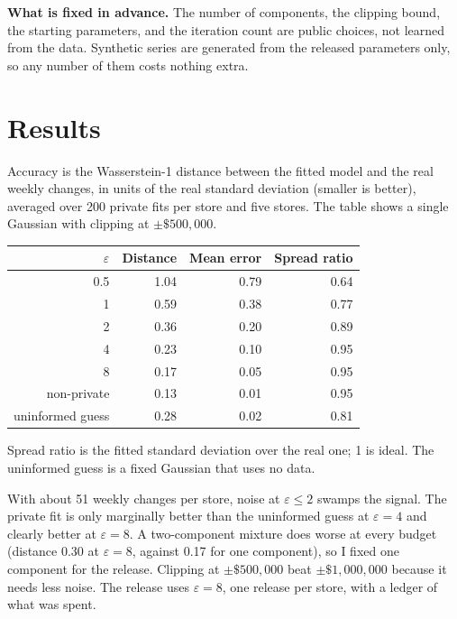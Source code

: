 \textbf{What is fixed in advance.} The number of components, the clipping bound, the starting parameters, and the iteration count are public choices, not learned from the data. Synthetic series are generated from the released parameters only, so any number of them costs nothing extra.

\section{Results}
Accuracy is the Wasserstein-1 distance between the fitted model and the real weekly changes, in units of the real standard deviation (smaller is better), averaged over 200 private fits per store and five stores. The table shows a single Gaussian with clipping at $\pm\$500{,}000$.

\begin{center}
\small
\begin{tabular}{@{}rrrr@{}}
\toprule
$\varepsilon$ & Distance & Mean error & Spread ratio\\
\midrule
0.5 & 1.04 & 0.79 & 0.64\\
1 & 0.59 & 0.38 & 0.77\\
2 & 0.36 & 0.20 & 0.89\\
4 & 0.23 & 0.10 & 0.95\\
8 & 0.17 & 0.05 & 0.95\\
non-private & 0.13 & 0.01 & 0.95\\
uninformed guess & 0.28 & 0.02 & 0.81\\
\bottomrule
\end{tabular}
\end{center}
Spread ratio is the fitted standard deviation over the real one; 1 is ideal. The uninformed guess is a fixed Gaussian that uses no data.

With about 51 weekly changes per store, noise at $\varepsilon\le 2$ swamps the signal. The private fit is only marginally better than the uninformed guess at $\varepsilon=4$ and clearly better at $\varepsilon=8$. A two-component mixture does worse at every budget (distance 0.30 at $\varepsilon=8$, against 0.17 for one component), so I fixed one component for the release. Clipping at $\pm\$500{,}000$ beat $\pm\$1{,}000{,}000$ because it needs less noise. The release uses $\varepsilon=8$, one release per store, with a ledger of what was spent.


